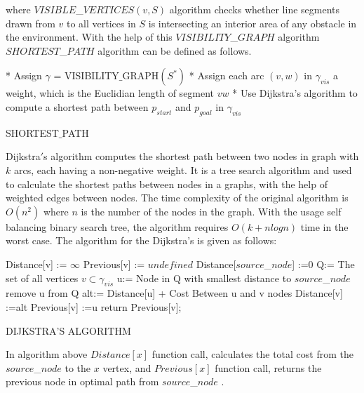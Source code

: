 where $VISIBLE$\_$VERTICES(v,S)$ algorithm checks whether line segments drawn from $v$ to all vertices in $S$ is intersecting an interior area of any obstacle in the environment. With the help of this $VISIBILITY$\_$GRAPH$ algorithm $SHORTEST$\_$PATH$ algorithm can be defined as follows.
	
\begin{algorithm}[H]
* Assign $\gamma$ = VISIBILITY$\_$GRAPH$(S^*)$ \newline
* Assign each arc $(v,w)$ in $\gamma_{vis}$ a weight, which is the Euclidian length of segment $vw$ \newline
* Use Dijkstra's algorithm to compute a shortest path between $p_{start}$ and $p_{goal}$ in $\gamma_{vis}$
\caption{SHORTEST$\_$PATH}
\end{algorithm}
	
Dijkstra$'$s algorithm computes the shortest path between two nodes in
graph with $k$ arcs, each having a non-negative weight. It is a tree search algorithm and  used to calculate the shortest paths between nodes in a graphs, with the help of weighted edges between nodes. The time complexity of the original algorithm is $O(n^2)$ where $n$ is the number of the nodes in the graph. With the usage self balancing binary search tree, the algorithm requires $O(k+nlogn)$ time in the worst case. The algorithm for the Dijkstra's is given as follows:
	
\begin{algorithm}[H]
{		
Distance[v] := $\infty$ \;
Previous[v] := $undefined$ \;
}
Distance[$source$\_$ node$] :=0  \;
Q:= The set of all vertices $v \subset \gamma_{vis}$ \;
{
u:= Node in Q with smallest distance to $source$\_$ node$\;
remove u from Q\;
{
alt:= Distance[u] + Cost Between u and v nodes\;
{
Distance[v] :=alt\;
Previous[v] :=u\;
}
}
}
return Previous[v]; \newline
\caption{DIJKSTRA'S ALGORITHM}
\end{algorithm}

In algorithm above $Distance[x]$ function call, calculates the total cost from the $source$\_$ node$ to the $x$ vertex, and $Previous[x]$ function call, returns the previous node in optimal path from $source$\_$ node$ .

